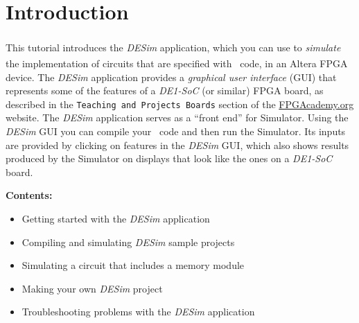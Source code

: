 \section{Introduction}

This tutorial introduces the {\it DESim}\textsuperscript{\textregistered} application, 
which you can use to {\it simulate} the implementation of circuits that are specified 
with \hdlName~code\ifnotSV{}\fi, 
in an Altera\textsuperscript{\textregistered} FPGA device. 
The {\it DESim} application provides a {\it graphical user interface} 
(GUI) that represents some of the features of a {\it DE1-SoC} (or similar) FPGA board, 
as described in the \texttt{Teaching and Projects Boards} section of the 
{\small \href{https://www.fpgacademy.org/boards.html} {FPGAcademy.org}} website.
The {\it DESim} application serves as a ``front end'' for 
 \fi
Simulator. Using the {\it DESim} GUI you can compile your
\hdlName~code and then run the Simulator. Its inputs are provided by 
clicking on features in the {\it DESim} GUI, which also shows results produced by 
the Simulator on displays that look like the ones on a {\it DE1-SoC} board.

{\bf Contents:}
\vspace{-1em}
\begin{itemize}
\item Getting started with the {\it DESim} application
\item Compiling and simulating {\it DESim} sample projects
\item Simulating a circuit that includes a memory module
\item Making your own {\it DESim} project
\item Troubleshooting problems with the {\it DESim} application
\end{itemize}

